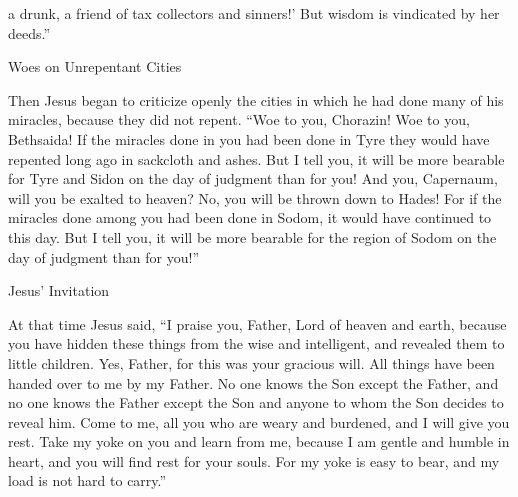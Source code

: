 {a drunk,
a friend
of tax collectors
and
sinners!’ But
wisdom
is vindicated
by
her
deeds.”
\par }{\SH Woes on Unrepentant Cities
\par }{\PP {}Then
Jesus began
to criticize openly
the cities
in
which
he had done
many
of his
miracles,
because
they did
not
repent.
“Woe
to you,
Chorazin! Woe
to you,
Bethsaida! If
the miracles
done
in
you
had been done
in
Tyre
they would have repented
long ago in
sackcloth
and
ashes.
But
I tell
you,
it will be
more bearable
for Tyre
and
Sidon
on
the day
of judgment
than
for you!
And
you,
Capernaum,
will you be exalted
to
heaven? No,
you will be thrown down
to
Hades! For
if
the miracles
done
among
you
had been done
in
Sodom,
it would have continued
to
this day.
But
I tell
you,
it will be
more bearable
for
the region
of Sodom
on
the day
of judgment
than
for you!”
\par }{\SH Jesus’ Invitation
\par }{\PP {}At
that
time
Jesus
said, “I praise
you,
Father,
Lord
of heaven
and
earth,
because
you have hidden
these things
from
the wise
and
intelligent,
and
revealed
them
to little children.
Yes,
Father,
for
this
was
your
gracious will.
All things
have been handed over
to me
by
my
Father.
No one
knows
the Son
except
the Father,
and no one
knows
the Father
except
the Son
and
anyone
to whom
the Son
decides
to reveal him.
Come
to
me,
all
you who are weary
and
burdened,
and I
will give
you
rest.
Take
my
yoke
on
you
and
learn
from
me,
because
I am
gentle
and
humble
in heart,
and
you will find
rest
for your
souls.
For
my
yoke
is easy to bear,
and
my
load
is
not hard to carry.”

}
